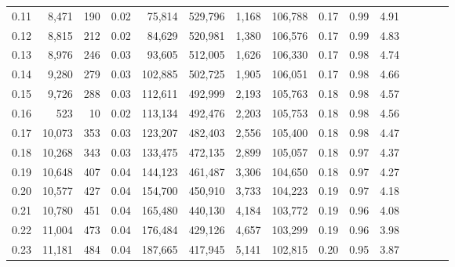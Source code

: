 \begin{tabular}{rrrcrrrrrrrrrrr}
0.11 &   8,471 &    190 &                                       0.02 &   75,814 &  529,796 &    1,168 &  106,788 &  0.17 &  0.99 &                         4.91 \\
0.12 &   8,815 &    212 &                                       0.02 &   84,629 &  520,981 &    1,380 &  106,576 &  0.17 &  0.99 &                         4.83 \\
0.13 &   8,976 &    246 &                                       0.03 &   93,605 &  512,005 &    1,626 &  106,330 &  0.17 &  0.98 &                         4.74 \\
0.14 &   9,280 &    279 &                                       0.03 &  102,885 &  502,725 &    1,905 &  106,051 &  0.17 &  0.98 &                         4.66 \\
0.15 &   9,726 &    288 &                                       0.03 &  112,611 &  492,999 &    2,193 &  105,763 &  0.18 &  0.98 &                         4.57 \\
0.16 &     523 &     10 &                                       0.02 &  113,134 &  492,476 &    2,203 &  105,753 &  0.18 &  0.98 &                         4.56 \\
0.17 &  10,073 &    353 &                                       0.03 &  123,207 &  482,403 &    2,556 &  105,400 &  0.18 &  0.98 &                         4.47 \\
0.18 &  10,268 &    343 &                                       0.03 &  133,475 &  472,135 &    2,899 &  105,057 &  0.18 &  0.97 &                         4.37 \\
0.19 &  10,648 &    407 &                                       0.04 &  144,123 &  461,487 &    3,306 &  104,650 &  0.18 &  0.97 &                         4.27 \\
0.20 &  10,577 &    427 &                                       0.04 &  154,700 &  450,910 &    3,733 &  104,223 &  0.19 &  0.97 &                         4.18 \\
0.21 &  10,780 &    451 &                                       0.04 &  165,480 &  440,130 &    4,184 &  103,772 &  0.19 &  0.96 &                         4.08 \\
0.22 &  11,004 &    473 &                                       0.04 &  176,484 &  429,126 &    4,657 &  103,299 &  0.19 &  0.96 &                         3.98 \\
0.23 &  11,181 &    484 &                                       0.04 &  187,665 &  417,945 &    5,141 &  102,815 &  0.20 &  0.95 &                         3.87 \\

\end{tabular}
